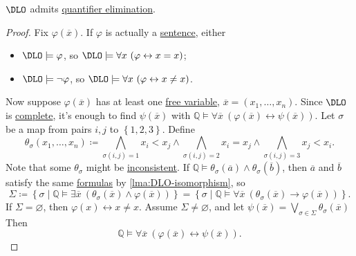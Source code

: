 \begin{theorem}\label{thm:DLO-QE}
	\(\DLO\) admits \hyperref[def:quantifier-elimination]{quantifier elimination}.
\end{theorem}
\begin{proof}
	Fix \(\varphi (\overline{x} )\). If \(\varphi \) is actually a \hyperref[def:sentence]{sentence}, either
	\begin{itemize}
		\item \(\DLO \models \varphi \), so \(\DLO \models \forall x\ (\varphi \leftrightarrow x = x)\);
		\item \(\DLO \models \lnot \varphi \), so \(\DLO \models \forall x\ (\varphi \leftrightarrow x \neq x)\).
	\end{itemize}
	Now suppose \(\varphi (\overline{x} )\) has at least one \hyperref[def:free-variable]{free variable}, \(\overline{x} = (x_1, \ldots , x_n)\). Since \(\DLO\) is \hyperref[def:theory-complete]{complete}, it's enough to find \(\psi (\overline{x} )\) with \(\mathbb{Q} \models \forall \overline{x} \ (\varphi (\overline{x} ) \leftrightarrow \psi (\overline{x} ))\). Let \(\sigma \) be a map from pairs \(i, j\) to \(\left\{ 1, 2, 3 \right\} \). Define
	\[
		\theta _\sigma (x_1, \ldots , x_n) \coloneqq \bigwedge_{\sigma (i, j) = 1} x_i < x_j \land \bigwedge_{\sigma (i, j)=2} x_i = x_j \land \bigwedge_{\sigma (i, j)=3} x_j < x_i.
	\]
	Note that some \(\theta _\sigma \) might be \hyperref[def:inconsistent]{inconsistent}. If \(\mathbb{Q} \models \theta _\sigma (\overline{a} ) \land \theta _\sigma (\overline{b} )\), then \(\overline{a} \) and \(\overline{b} \) satisfy the same \hyperref[def:formula]{formulas} by \autoref{lma:DLO-isomorphism}, so
	\[
		\Sigma
		\coloneqq \left\{ \sigma \mid \mathbb{Q} \models \exists \overline{x}\ (\theta _\sigma (\overline{x} ) \land \varphi (\overline{x} )) \right\}
		= \left\{ \sigma \mid \mathbb{Q} \models \forall \overline{x}\ (\theta _\sigma (\overline{x} ) \to \varphi (\overline{x} )) \right\}.
	\]
	If \(\Sigma = \varnothing \), then \(\varphi (x) \leftrightarrow x \neq x\). Assume \(\Sigma \neq \varnothing \), and let \(\psi (\overline{x} ) = \bigvee_{\sigma \in \Sigma } \theta _\sigma (\overline{x} ) \) Then
	\[
		\mathbb{Q} \models \forall \overline{x} \ (\varphi (\overline{x} ) \leftrightarrow \psi (\overline{x} )).
	\]
\end{proof}